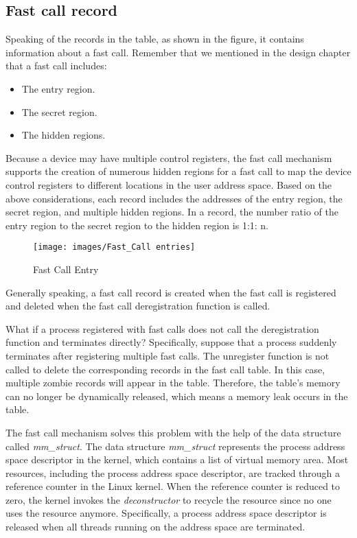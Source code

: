 \subsection{Fast call record}

Speaking of the records in the table, as shown in the figure, it contains information about 
a fast call.  Remember that we mentioned in the design chapter that 
a fast call includes:
\begin{itemize}
  \item The entry region.
  \item The secret region.
  \item The hidden regions.
\end{itemize}
Because a device may have multiple control registers, 
the fast call mechanism supports the creation of numerous 
hidden regions for a fast call to map the device control registers to different locations in 
the user address space. Based on the above considerations, each record includes the addresses of 
the entry region, the secret region, and multiple hidden regions. 
In a record, the number ratio of the entry region to the secret region 
to the hidden region is 1:1: n.
\begin{figure}[tbp]
  \centering
  \texttt{[image: images/Fast\_Call entries]}
  \caption[Fast Call Entry]{Fast Call Entry}
  \label{fig:Fast_Call_entries}
\end{figure}
Generally speaking, a fast call record is created when the 
fast call is registered and deleted when the fast call deregistration 
function is called.

What if a process registered with fast calls does 
not call the deregistration function and terminates directly? 
Specifically, suppose that a process suddenly terminates after 
registering multiple fast calls. The unregister function is not 
called to delete the corresponding records in the fast call table. 
In this case, multiple zombie records will appear in the table. 
Therefore, the table's memory can no longer be dynamically released, 
which means a memory leak occurs in the table.

The fast call mechanism solves this problem with the help 
of the data structure called \emph{mm\_struct}.  The data structure \emph{mm\_struct}
represents the process address space descriptor\cite{10.5555/983550} in the kernel, which contains a list of virtual memory area.
 Most resources, including the process address space descriptor, 
 are tracked through a reference counter in the Linux kernel.  
 When the reference counter is reduced to zero, the kernel invokes the 
 \emph{deconstructor} to recycle the resource since no one uses the resource anymore.  
 Specifically, a process address space descriptor is released when all threads 
 running on the address space are terminated. 

